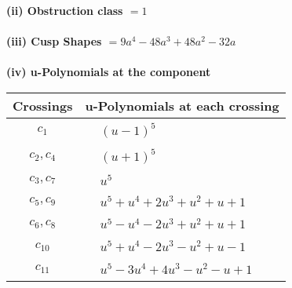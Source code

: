 \documentclass[1p]{elsarticle_modified}
\theoremstyle{definition}
\begin{document}
\flushleft \textbf{(ii) Obstruction class $= 1$}\\~\\
\flushleft \textbf{(iii) Cusp Shapes $= 9 a^4-48 a^3+48 a^2-32 a$}\\~\\
\newpage\renewcommand{\arraystretch}{1}
\flushleft \textbf{(iv) u-Polynomials at the component}\newline \\
\begin{tabular}{m{50pt}|m{274pt}}
Crossings & \hspace{64pt}u-Polynomials at each crossing \\
\hline $$\begin{aligned}c_{1}\end{aligned}$$&$\begin{aligned}
&(u-1)^5
\end{aligned}$\\
\hline $$\begin{aligned}c_{2},c_{4}\end{aligned}$$&$\begin{aligned}
&(u+1)^5
\end{aligned}$\\
\hline $$\begin{aligned}c_{3},c_{7}\end{aligned}$$&$\begin{aligned}
&u^5
\end{aligned}$\\
\hline $$\begin{aligned}c_{5},c_{9}\end{aligned}$$&$\begin{aligned}
&u^5+u^4+2 u^3+u^2+u+1
\end{aligned}$\\
\hline $$\begin{aligned}c_{6},c_{8}\end{aligned}$$&$\begin{aligned}
&u^5- u^4-2 u^3+u^2+u+1
\end{aligned}$\\
\hline $$\begin{aligned}c_{10}\end{aligned}$$&$\begin{aligned}
&u^5+u^4-2 u^3- u^2+u-1
\end{aligned}$\\
\hline $$\begin{aligned}c_{11}\end{aligned}$$&$\begin{aligned}
&u^5-3 u^4+4 u^3- u^2- u+1
\end{aligned}$\\
\hline
\end{tabular}\\~\\
\end{document}
